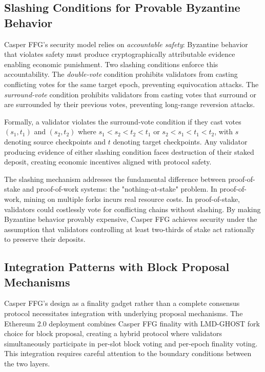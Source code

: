 \subsection{Slashing Conditions for Provable Byzantine Behavior}

Casper FFG's security model relies on \emph{accountable safety}: Byzantine behavior that violates safety must produce cryptographically attributable evidence enabling economic punishment. Two slashing conditions enforce this accountability. The \emph{double-vote} condition prohibits validators from casting conflicting votes for the same target epoch, preventing equivocation attacks. The \emph{surround-vote} condition prohibits validators from casting votes that surround or are surrounded by their previous votes, preventing long-range reversion attacks.

Formally, a validator violates the surround-vote condition if they cast votes $(s_1, t_1)$ and $(s_2, t_2)$ where $s_1 < s_2 < t_2 < t_1$ or $s_2 < s_1 < t_1 < t_2$, with $s$ denoting source checkpoints and $t$ denoting target checkpoints. Any validator producing evidence of either slashing condition faces destruction of their staked deposit, creating economic incentives aligned with protocol safety.

The slashing mechanism addresses the fundamental difference between proof-of-stake and proof-of-work systems: the "nothing-at-stake" problem. In proof-of-work, mining on multiple forks incurs real resource costs. In proof-of-stake, validators could costlessly vote for conflicting chains without slashing. By making Byzantine behavior provably expensive, Casper FFG achieves security under the assumption that validators controlling at least two-thirds of stake act rationally to preserve their deposits.

\subsection{Integration Patterns with Block Proposal Mechanisms}

Casper FFG's design as a finality gadget rather than a complete consensus protocol necessitates integration with underlying proposal mechanisms. The Ethereum 2.0 deployment combines Casper FFG finality with LMD-GHOST fork choice for block proposal, creating a hybrid protocol where validators simultaneously participate in per-slot block voting and per-epoch finality voting. This integration requires careful attention to the boundary conditions between the two layers.

